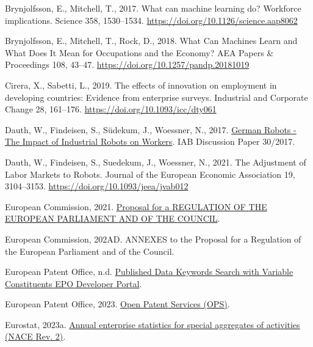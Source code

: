 \documentclass[
  11,
  a4paperpaper,
]{article}
\newlength{\cslhangindent}
\newenvironment{CSLReferences}[2] %
 {\begin{list}{}{%
  \setlength{\itemindent}{0pt}
  \setlength{\leftmargin}{0pt}
  \setlength{\parsep}{0pt}
  \ifodd #1
   \setlength{\leftmargin}{\cslhangindent}
   \setlength{\itemindent}{-1\cslhangindent}
  \fi
  \setlength{\itemsep}{#2\baselineskip}}}
 {\end{list}}
\begin{document}
\begin{CSLReferences}{1}{0}
Brynjolfsson, E., Mitchell, T., 2017. What can machine learning do?
{Workforce} implications. Science 358, 1530--1534.
\url{https://doi.org/10.1126/science.aap8062}

Brynjolfsson, E., Mitchell, T., Rock, D., 2018. What {Can} {Machines}
{Learn} and {What} {Does} {It} {Mean} for {Occupations} and the
{Economy}? AEA Papers \& Proceedings 108, 43--47.
\url{https://doi.org/10.1257/pandp.20181019}

Cirera, X., Sabetti, L., 2019. The effects of innovation on employment
in developing countries: Evidence from enterprise surveys. Industrial
and Corporate Change 28, 161--176.
\url{https://doi.org/10.1093/icc/dty061}

Dauth, W., Findeisen, S., Südekum, J., Woessner, N., 2017.
\href{https://ssrn.com/abstract=3039031}{German {Robots} - {The}
{Impact} of {Industrial} {Robots} on {Workers}}. IAB Discussion Paper
30/2017.

Dauth, W., Findeisen, S., Suedekum, J., Woessner, N., 2021. The
{Adjustment} of {Labor} {Markets} to {Robots}. Journal of the European
Economic Association 19, 3104--3153.
\url{https://doi.org/10.1093/jeea/jvab012}

European Commission, 2021.
\href{https://eur-lex.europa.eu/legal-content/EN/TXT/HTML/?uri=CELEX:52021PC0206}{Proposal
for a {REGULATION} {OF} {THE} {EUROPEAN} {PARLIAMENT} {AND} {OF} {THE}
{COUNCIL}}.

European Commission, 202AD. {ANNEXES} to the {Proposal} for a
{Regulation} of the {European} {Parliament} and of the {Council}.

European Patent Office, n.d.
\href{https://developers.epo.org/ops-v3-2/apis/get/published-data/search/\%7Bconstituent\%7D}{Published
{Data} {Keywords} {Search} with {Variable} {Constituents} {\textbar}
{EPO} {Developer} {Portal}}.

European Patent Office, 2023.
\href{https://developers.epo.org/ops-v3-2/apis}{Open {Patent} {Services}
({OPS})}.

Eurostat, 2023a.
\href{https://ec.europa.eu/eurostat/databrowser/view/sbs_na_sca_r2/default/table?lang=en}{Annual
enterprise statistics for special aggregates of activities ({NACE}
{Rev}. 2)}.


\end{CSLReferences}
\end{document}
